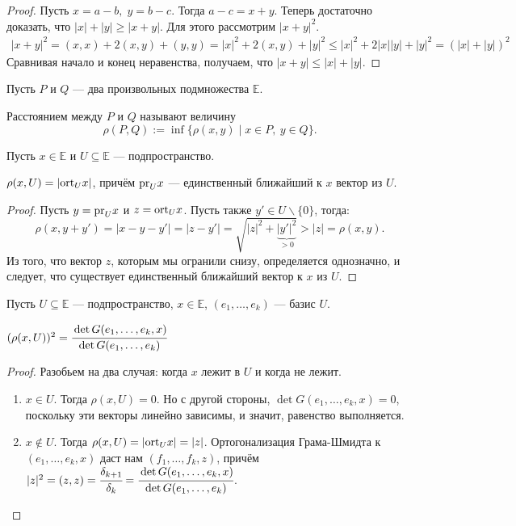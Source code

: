 \begin{proof}
	Пусть $x = a-b,\; y = b - c$. Тогда $a-c = x +y$. Теперь достаточно доказать, что $|x| + |y| \geqslant |x + y|$. Для этого рассмотрим $|x + y|^2$.
	\begin{gather*}
	|x+y|^2 = (x, x) + 2(x, y) + (y, y) = |x|^2 + 2(x, y) + |y|^2 \leqslant |x|^2 + 2|x||y|+ |y|^2 = (|x| + |y|)^2
	\end{gather*}
	Сравнивая начало и конец неравенства, получаем, что $|x+y| \leqslant |x| + |y|$.
\end{proof}
Пусть $P$ и $Q$ --- два произвольных подмножества $\mathbb{E}$.
\begin{Def}
	Расстоянием между $P$ и $Q$ называют величину 
	$$
	\rho (P,Q) := \inf \{\rho(x,y) \mid x\in P,\ y\in Q\}.
	$$
\end{Def}
Пусть $x \in \mathbb{E}$ и $U \subseteq \mathbb{E}$ --- подпространство.
\begin{Theorem}
	$\rho (x,U) = |\mathrm{ort}_U x|$, причём $\mathrm{pr}_U x$ --- единственный ближайший к $x$ вектор из $U$.
\end{Theorem}
\begin{proof}
	Пусть $y = \mathrm{pr}_U x$ и $z = \mathrm{ort}_U x$. Пусть также $y' \in U\backslash \{0\}$, тогда:
	\[
		\rho(x, y + y') = |x - y - y'| = |z - y'| = \sqrt{|z|^2 + \underbrace{|y'|^2}_{>0}} > |z| = \rho(x,y).
	\]
	Из того, что вектор $z$, которым мы огранили снизу, определяется однозначно, и следует, что существует единственный ближайший вектор к $x$ из $U$.
\end{proof}
Пусть $U \subseteq \mathbb{E}$ --- подпространство, $x \in \mathbb{E}$, $(e_1, \ldots, e_k)$ --- базис $U$.
\begin{Theorem}
	$(\rho(x,U))^2 = \cfrac{\det G(e_1, \ldots, e_k, x)}{\det G(e_1, \ldots, e_k)}$
\end{Theorem}
\begin{proof}
	Разобьем на два случая: когда $x$ лежит в $U$ и когда не лежит.
	\begin{enumerate}
	\item $x \in U$. Тогда $\rho (x,U) = 0$. Но с другой стороны, $\det G(e_1, \ldots, e_k, x) = 0$, поскольку эти векторы линейно зависимы, и значит, равенство выполняется.
	\item $x \notin U$. Тогда $\rho(x,U) = |\mathrm{ort}_U x| = |z|$. Ортогонализация Грама-Шмидта к $(e_1, \ldots, e_k, x)$ даст нам $(f_1, \ldots, f_k, z)$, причём $|z|^2 = (z,z) = \cfrac{\delta_{k+1}}{\delta_{k}} = \cfrac{\det G(e_1, \ldots, e_k, x)}{\det G(e_1, \ldots, e_k)}$.
	\end{enumerate}
\end{proof}

